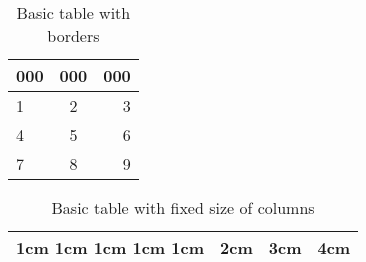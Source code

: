 \documentclass{article}
\begin{document}
\begin{table}
	\centering
	\begin{tabular}{| l | c | r |}
		\hline
		000 & 000 & 000 \\
		\hline
		1 & 2 & 3 \\
		\hline
		4 & 5 & 6 \\
		\hline
		7 & 8 & 9 \\
		\hline
	\end{tabular}
	\caption{Basic table with borders}
\end{table}

\begin{table}
	\centering
	\begin{tabular}{| m{1cm} | p{2cm} | m{3cm} | m{4cm} |}
		\hline
		1cm 1cm 1cm 1cm 1cm & 2cm & 3cm & 4cm \\
		\hline
	\end{tabular}
	\caption{Basic table with fixed size of columns}
\end{table}
\end{document}
